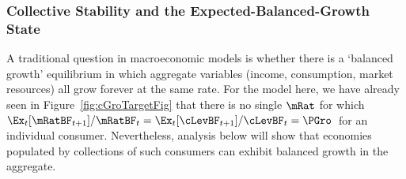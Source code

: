 \documentclass[BufferStockTheory]{subfiles}
\begin{document}
 \begin{comment}
 The full proof is in Appendix~\ref{sec:ApndxMTargetIsStable}, but the key points can be made informally here.  Existence of such a point is guaranteed by
 \begin{enumerate}
 \item Existence, continuity, and monotonicity of $\Ex_t [{\mRat}_{t+1}-\mRat_t]$
 \item $\lim_{\mRat_{t}\downarrow 0} \Ex_t [{\mRat}_{t+1}/\mRat_t] > 1 > \lim_{\mRat_{t}\uparrow \infty} \Ex_t [{\mRat}_{t+1}/\mRat_t]$
\item The intermediate value theorem
\end{enumerate}
 \begin{align}
   \bar{\Rnorm}(1-\usual{\cFunc}^{\prime}(\mTrg)) & = 1 \\
   (1-\usual{\cFunc}^{\prime}(\mTrg)) & = \bar{\Rnorm}^{-1} \\   
 \end{align}

 The fact (cf.\ \eqref{eq:MinMPCDef}) that the minimum value of $\usual{\cFunc}^{\prime}$ is $1-\PatR$ converts \eqref{eq:mTargDerImplicit} to the inequality $1-\bar{\Rnorm}^{-1} > 1-\PatR$ from which we have
 \begin{align}
      \PGroAdj/\Rfree & > \Pat/\Rfree \notag
\\    1 & > \Pat/\PGroAdj
 \end{align}
 which is the {\GICNrm}; thus, if a stable point exists, it must satisfy the {\GICNrm}.  (The appendix proves that if the {\GICNrm} is satisfied, such a point must exist, and be globally stable).
\end{comment}

 \hypertarget{Collective-Stability}{}
 \subsubsection{Collective Stability and the Expected-Balanced-Growth State}\label{subsubsec:mSteadyState}
 A traditional question in macroeconomic models is whether there is a `balanced growth' equilibrium in which aggregate variables (income, consumption, market resources) all grow forever at the same rate.  For the model here, we have already seen in Figure~\ref{fig:cGroTargetFig} that there is no single $\mRat$ for which $\Ex_{t}[\mRatBF_{t+1}]/\mRatBF_{t} = \Ex_{t}[\cLevBF_{t+1}]/\cLevBF_{t} = \PGro$~for an individual consumer.  Nevertheless, analysis below will show that economies populated by collections of such consumers can exhibit balanced growth in the aggregate.
\end{document}
